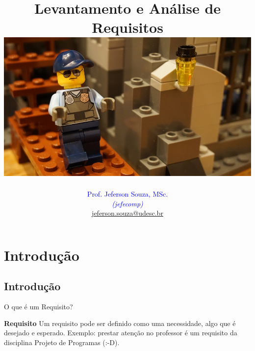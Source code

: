 \documentclass[xcolor=x11names,compress]{beamer}
\begin{document}
\title[Levantamento e Análise de Requisitos \hskip30mm \insertframenumber / \inserttotalframenumber  \hskip27mm \inserttitlegraphic]{Levantamento e Análise de Requisitos \\[4mm]
\includegraphics[keepaspectratio,width=.5\textwidth]{lego-ppr}}
\author[@2018 Prof. Jeferson Souza, MSc (jefecomp) - All rights reserved.]{
	\textcolor{blue}{Prof. Jeferson Souza, MSc.} \\[1mm] 
	\textcolor{blue}{\textit{{\footnotesize (jefecomp) }}}\\[1.5mm]
	 \underline{{\footnotesize jeferson.souza@udesc.br}}
	 \vspace*{1mm}
}

\date{}


\begin{frame}
\titlepage
\end{frame}

\section{Introdução}
\subsection{Introdução}
\begin{frame}{O que é um Requisito?}

\begin{alertblock}{\textbf{Requisito}}
Um requisito pode ser definido como uma necessidade, algo que é desejado e esperado. Exemplo: prestar atenção no professor é um requisito da disciplina Projeto de Programas (:-D).
\end{alertblock}

\end{frame}
\end{document}
